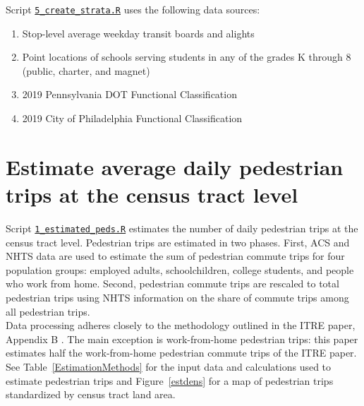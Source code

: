 \documentclass[paper=letterpaper, fontsize=11pt]{scrartcl}
\begin{document}
Script \href{https://github.com/addisonlarson/ped_counts/blob/master/5_create_strata.R}{\texttt{5\_create\_strata.R}} uses the following data sources:
\begin{enumerate}[itemsep=-4pt]
	\item Stop-level average weekday transit boards and alights
	\item Point locations of schools serving students in any of the grades K through 8 (public, charter, and magnet)
	\item 2019 Pennsylvania DOT Functional Classification
	\item 2019 City of Philadelphia Functional Classification
\end{enumerate}

\section{Estimate average daily pedestrian trips at the census tract level}
\label{sec:estimate-peds}
Script \href{https://github.com/addisonlarson/ped_counts/blob/master/1_estimated_peds.R}{\texttt{1\_estimated\_peds.R}} estimates the number of daily pedestrian trips at the census tract level. Pedestrian trips are estimated in two phases. First, ACS and NHTS data are used to estimate the sum of pedestrian commute trips for four population groups: employed adults, schoolchildren, college students, and people who work from home. Second, pedestrian commute trips are rescaled to total pedestrian trips using NHTS information on the share of commute trips among all pedestrian trips. \\

Data processing adheres closely to the methodology outlined in the ITRE paper, Appendix B \cite{ncstate}. The main exception is work-from-home pedestrian trips: this paper estimates half the work-from-home pedestrian commute trips of the ITRE paper. See Table~\ref{EstimationMethods} for the input data and calculations used to estimate pedestrian trips and Figure~\ref{estdens} for a map of pedestrian trips standardized by census tract land area.
\end{document}
